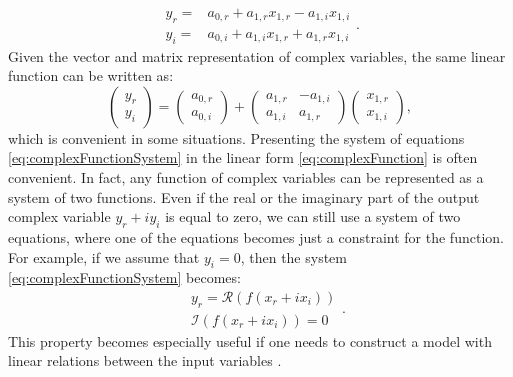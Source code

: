 \documentclass[
]{book}
\begin{document}
\begin{equation*}
    \begin{aligned}
        y_r = & a_{0,r} + a_{1,r} x_{1,r} - a_{1,i} x_{1,i} \\
        y_i = & a_{0,i} + a_{1,i} x_{1,r} + a_{1,r} x_{1,i}
    \end{aligned} .
\end{equation*}
Given the vector and matrix representation of complex variables, the same linear function can be written as:
\begin{equation*}
    \begin{pmatrix} y_r \\ y_i \end{pmatrix} = \begin{pmatrix} a_{0,r} \\ a_{0,i} \end{pmatrix} + \begin{pmatrix} a_{1,r} & -a_{1,i} \\ a_{1,i} & a_{1,r} \end{pmatrix} \begin{pmatrix} x_{1,r} \\ x_{1,i} \end{pmatrix} ,
\end{equation*}
which is convenient in some situations. Presenting the system of equations \eqref{eq:complexFunctionSystem} in the linear form \eqref{eq:complexFunction} is often convenient. In fact, any function of complex variables can be represented as a system of two functions. Even if the real or the imaginary part of the output complex variable \(y_r + i y_i\) is equal to zero, we can still use a system of two equations, where one of the equations becomes just a constraint for the function. For example, if we assume that \(y_i=0\), then the system \eqref{eq:complexFunctionSystem} becomes:
\begin{equation*}
    \begin{aligned}
        & y_r = \mathcal{R}(f(x_r+ix_i)) \\
        & \mathcal{I}(f(x_r+ix_i)) = 0
    \end{aligned} .
\end{equation*}
This property becomes especially useful if one needs to construct a model with linear relations between the input variables \citep[this is discussed in Chapter ??? of][]{Svetunkov2014}.
\end{document}
